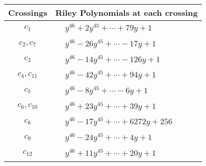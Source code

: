 \documentclass[1p]{elsarticle_modified}
\theoremstyle{definition}
\begin{document}
\begin{tabular}{m{50pt}|m{274pt}}
Crossings & \hspace{64pt}Riley Polynomials at each crossing \\
\hline $$\begin{aligned}c_{1}\end{aligned}$$&$\begin{aligned}
&y^{46}+2 y^{45}+\cdots+79 y+1
\end{aligned}$\\
\hline $$\begin{aligned}c_{2},c_{7}\end{aligned}$$&$\begin{aligned}
&y^{46}-26 y^{45}+\cdots-17 y+1
\end{aligned}$\\
\hline $$\begin{aligned}c_{3}\end{aligned}$$&$\begin{aligned}
&y^{46}-14 y^{45}+\cdots-126 y+1
\end{aligned}$\\
\hline $$\begin{aligned}c_{4},c_{11}\end{aligned}$$&$\begin{aligned}
&y^{46}-42 y^{45}+\cdots+94 y+1
\end{aligned}$\\
\hline $$\begin{aligned}c_{5}\end{aligned}$$&$\begin{aligned}
&y^{46}-8 y^{45}+\cdots-6 y+1
\end{aligned}$\\
\hline $$\begin{aligned}c_{6},c_{10}\end{aligned}$$&$\begin{aligned}
&y^{46}+23 y^{45}+\cdots+39 y+1
\end{aligned}$\\
\hline $$\begin{aligned}c_{8}\end{aligned}$$&$\begin{aligned}
&y^{46}-17 y^{45}+\cdots+6272 y+256
\end{aligned}$\\
\hline $$\begin{aligned}c_{9}\end{aligned}$$&$\begin{aligned}
&y^{46}-24 y^{45}+\cdots+4 y+1
\end{aligned}$\\
\hline $$\begin{aligned}c_{12}\end{aligned}$$&$\begin{aligned}
&y^{46}+11 y^{45}+\cdots+20 y+1
\end{aligned}$\\
\hline
\end{tabular}\\~\\
\end{document}
